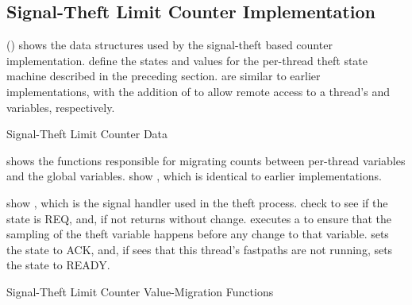 \subsection{Signal-Theft Limit Counter Implementation}
\label{sec:count:Signal-Theft Limit Counter Implementation}

\begin{fcvref}
()
shows the data structures used by the signal-theft based counter
implementation.
 define the states and values
for the per-thread theft state machine
described in the preceding section.
 are similar to earlier implementations,
with the addition of
 to allow remote access to a
thread's 
and  variables, respectively.
\end{fcvref}

\begin{listing}
\caption{Signal-Theft Limit Counter Data}
\label{lst:count:Signal-Theft Limit Counter Data}
\end{listing}

\begin{fcvref}
shows the functions responsible for migrating counts between per-thread
variables and the global variables.
 show ,
which is identical to earlier
implementations.
\end{fcvref}
\begin{fcvref}
 show ,
which is the signal
handler used in the theft process.
 check to see if
the  state is REQ, and, if not
returns without change.
 executes a  to ensure that the sampling
of the theft variable happens before any change to that variable.
 sets the  state to ACK, and, if
 sees that
this thread's fastpaths are not running,  sets the 
state to READY\@.
\end{fcvref}

\begin{listing}
\caption{Signal-Theft Limit Counter Value-Migration Functions}
\label{lst:count:Signal-Theft Limit Counter Value-Migration Functions}
\end{listing}

